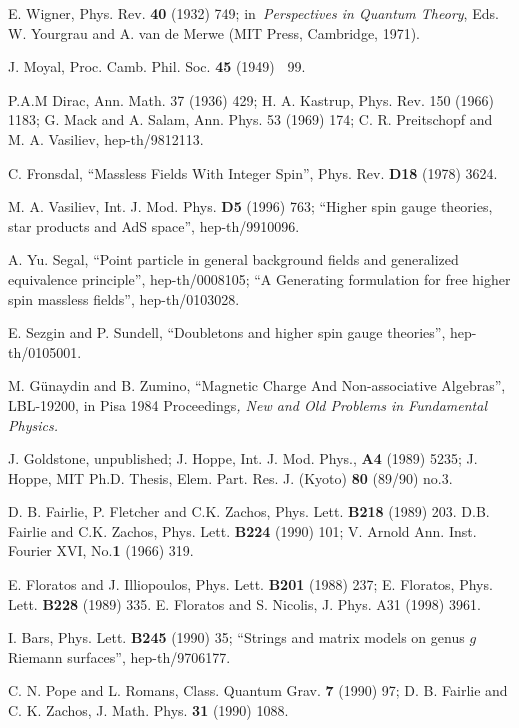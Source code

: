 \documentclass[a4paper,12pt]{article}
\begin{document}
\begin{thebibliography}{99}
  E. Wigner, Phys. Rev. \textbf{40} (1932) 749; in\textit{\
Perspectives in Quantum Theory}, Eds. W. Yourgrau and A. van de Merwe (MIT
Press, Cambridge, 1971).

  J. Moyal, Proc. Camb. Phil. Soc. \textbf{45 }(1949)\textbf{%
\ }99.

  P.A.M Dirac, Ann. Math. 37 (1936) 429; H. A. Kastrup, Phys.
Rev. 150 (1966) 1183; G. Mack and A. Salam, Ann. Phys. 53 (1969) 174; C. R.
Preitschopf and M. A. Vasiliev, hep-th/9812113.

  C. Fronsdal, ``Massless Fields With Integer Spin'',
Phys. Rev. \textbf{D18} (1978) 3624.

  M. A. Vasiliev, Int. J. Mod. Phys. \textbf{D5 }(1996) 763;
``Higher spin gauge theories, star products and AdS space'', hep-th/9910096.

  A. Yu. Segal, ``Point particle in general background fields
and generalized equivalence principle'', hep-th/0008105; ``A Generating
formulation for free higher spin massless fields'', hep-th/0103028.

  E. Sezgin and P. Sundell, ``Doubletons and higher spin
gauge theories'', hep-th/0105001.

  M. G\"{u}naydin and B. Zumino, ``Magnetic Charge And
Non-associative Algebras'', LBL-19200, in Pisa 1984 Proceedings\textit{, New
and Old Problems in Fundamental Physics.}

  J. Goldstone, unpublished; J. Hoppe, Int. J. Mod. Phys., 
\textbf{A4} (1989) 5235; J. Hoppe, MIT Ph.D. Thesis, Elem. Part. Res. J.
(Kyoto) \textbf{80} (89/90) no.3.

  D. B. Fairlie, P. Fletcher and C.K. Zachos, Phys. Lett. 
\textbf{B218} (1989) 203. D.B. Fairlie and C.K. Zachos, Phys. Lett. \textbf{%
B224} (1990) 101; V. Arnold Ann. Inst. Fourier XVI, No.\textbf{1} (1966) 319.

  E. Floratos and J. Illiopoulos, Phys. Lett. \textbf{B201}
(1988) 237; E. Floratos, Phys. Lett. \textbf{B228} (1989) 335. E. Floratos
and S. Nicolis, J. Phys. A31 (1998) 3961.

  I. Bars, Phys. Lett. \textbf{B245} (1990) 35; ``Strings
and matrix models on genus $g$ Riemann surfaces'', hep-th/9706177.

  C. N. Pope and L. Romans, Class. Quantum Grav. \textbf{7}
(1990) 97; D. B. Fairlie and C. K. Zachos, J. Math. Phys. \textbf{31} (1990)
1088.


\end{thebibliography}
\end{document}
